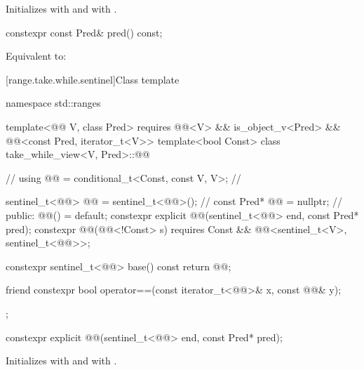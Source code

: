 \begin{itemdescr}
\pnum
\effects
Initializes  with  and
 with .
\end{itemdescr}

%
\begin{itemdecl}
constexpr const Pred& pred() const;
\end{itemdecl}

\begin{itemdescr}
\pnum
\effects
Equivalent to: 
\end{itemdescr}

[range.take.while.sentinel]{Class template }

%
\begin{codeblock}
namespace std::ranges {
  template<@@ V, class Pred>
    requires @@<V> && is_object_v<Pred> &&
             @@<const Pred, iterator_t<V>>
  template<bool Const>
  class take_while_view<V, Pred>::@@ {            // \expos
    using @@ = conditional_t<Const, const V, V>;      // \expos

    sentinel_t<@@> @@ = sentinel_t<@@>();         // \expos
    const Pred* @@ = nullptr;                        // \expos
  public:
    @@() = default;
    constexpr explicit @@(sentinel_t<@@> end, const Pred* pred);
    constexpr @@(@@<!Const> s)
      requires Const && @@<sentinel_t<V>, sentinel_t<@@>>;

    constexpr sentinel_t<@@> base() const { return @@; }

    friend constexpr bool operator==(const iterator_t<@@>& x, const @@& y);
  };
}
\end{codeblock}

%
\begin{itemdecl}
constexpr explicit @@(sentinel_t<@@> end, const Pred* pred);
\end{itemdecl}

\begin{itemdescr}
\pnum
\effects
Initializes  with  and  with .
\end{itemdescr}

